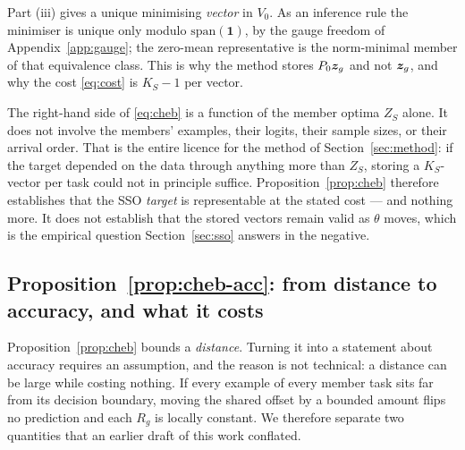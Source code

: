 \begin{remark}
Part (iii) gives a unique minimising \emph{vector} in $V_0$. As an inference rule
the minimiser is unique only modulo $\mathrm{span}(\mathbf{1})$, by the gauge
freedom of Appendix~\ref{app:gauge}; the zero-mean representative is the
norm-minimal member of that equivalence class. This is why the method stores
$P_0\bm{z}_g$ and not $\bm{z}_g$, and why the cost \eqref{eq:cost} is $K_S-1$ per vector.
\end{remark}

\begin{remark}
\label{rem:streamable}
The right-hand side of \eqref{eq:cheb} is a function of the member optima $Z_S$
alone. It does not involve the members' examples, their logits, their sample sizes,
or their arrival order. That is the entire licence for the method of
Section~\ref{sec:method}: if the target depended on the data through anything more
than $Z_S$, storing a $K_S$-vector per task could not in principle suffice.
Proposition~\ref{prop:cheb} therefore establishes that the SSO \emph{target} is
representable at the stated cost --- and nothing more. It does not establish that
the stored vectors remain valid as $\theta$ moves, which is the empirical question
Section~\ref{sec:sso} answers in the negative.
\end{remark}

\subsection{Proposition~\ref{prop:cheb-acc}: from distance to accuracy, and what it costs}
\label{app:proof-cheb-acc}

Proposition~\ref{prop:cheb} bounds a \emph{distance}. Turning it into a statement
about accuracy requires an assumption, and the reason is not technical: a distance
can be large while costing nothing. If every example of every member task sits far
from its decision boundary, moving the shared offset by a bounded amount flips no
prediction and each $R_g$ is locally constant. We therefore separate two
quantities that an earlier draft of this work conflated.

